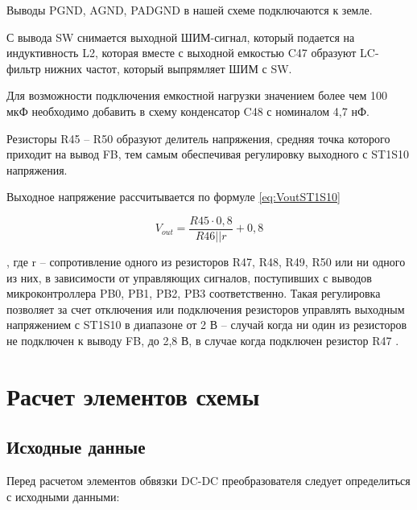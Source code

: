 Выводы PGND, AGND, PADGND в нашей схеме подключаются к земле. 

С вывода SW снимается выходной ШИМ-сигнал, который подается на индуктивность L2, которая вместе с 
выходной емкостью C47 образуют LC-фильтр нижних частот, который выпрямляет ШИМ с SW. 

Для возможности подключения емкостной нагрузки значением более чем 100 мкФ необходимо добавить в схему 
конденсатор C48 с номиналом 4,7 нФ. 

Резисторы R45 -- R50 образуют делитель напряжения, средняя точка которого приходит на вывод FB, тем самым 
обеспечивая регулировку выходного с ST1S10 напряжения. 

Выходное напряжение рассчитывается по формуле \ref{eq:VoutST1S10}

\begin{equation}
    V_{out} = \frac{R45 \cdot 0,8}{R46 || r} + 0,8 
    \label{eq:VoutST1S10}
\end{equation}

, где r -- сопротивление одного из резисторов R47, R48, R49, R50 или ни одного из них, 
в зависимости от управляющих сигналов, поступивших с выводов микроконтроллера  PB0, PB1, PB2, PB3 
соответственно. Такая регулировка позволяет за счет отключения или подключения резисторов управлять 
выходным напряжением с ST1S10 в диапазоне от 2 В -- случай когда ни один из резисторов не подключен к 
выводу FB, до 2,8 В, в случае когда подключен резистор R47 \cite{ST1S10:datasheet}. 


\section{Расчет элементов схемы}
\subsection{Исходные данные}
\hspace{1cm} 

Перед расчетом элементов обвязки DC-DC преобразователя следует определиться с исходными данными:

